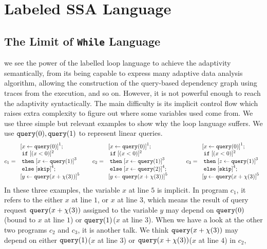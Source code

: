 \section{Labeled SSA Language}
%
{
\subsection{The Limit of {\tt While} Language}
we see the power of the labelled loop language to achieve the adaptivity semantically, from its being capable to express many adaptive data analysis algorithm,  allowing the construction of the query-based dependency graph using traces from the execution, and so on.
However, it is not powerful enough to reach the adaptivity syntactically. The main difficulty is its implicit control flow which raises extra complexity to figure out where some variables used come from. We use three simple but relevant examples to show why the loop language suffers. We use ${\tt query}(0),{\tt query}(1)$ to represent linear queries.
%
\[
 c_1 = \begin{array}{l}
      \clabel{ \assign{x}{\query(0)}}^{1} ; \\
      \eif  [(x < 0 )]^{2} \\
      \ethen \clabel{\assign{x}{\query(1)}}^{3}\\
      \eelse \clabel{\eskip}^{4} ; \\
      \clabel{\assign{y}{\query(x+\chi(3))}}^{5}
 \end{array}
 ~~~~~
 c_2 = \begin{array}{l}
      \clabel{ \assign{x}{\query(0)}}^{1} ; \\
      \eif  [(x < 0 )]^{2} \\
      \ethen \clabel{\assign{x}{\query(1)}}^{3}\\
      \eelse \clabel{\assign{x}{\query(2)}}^{4} ; \\
      \clabel{\assign{y}{\query(x+\chi(3))}}^{5}
 \end{array}
 ~~~~~~~~
  c_3 = \begin{array}{l}
      \clabel{ \assign{x}{\query(0)}}^{1} ; \\
      \eif  [(x < 0 )]^{2} \\
      \ethen \clabel{\assign{z}{\query(1)}}^{3}\\
      \eelse \clabel{\eskip}^{4} ; \\
      \clabel{\assign{y}{\query(x+\chi(3)}}^{5}
 \end{array}
\]
In these three examples, the variable $x$ at line $5$ is implicit. In program $c_1$, it refers to the either $x$ at line $1$, or $x$ at line $3$, which means the result of query request ${\tt query}(x+\chi(3))$ assigned to the variable $y$ may depend on ${\tt query}(0)$(bound to $x$ at line $1$) or ${\tt query}(1)$($x$ at line $3$). When we have a look at the other two programs $c_2$ and $c_3$, it is another talk. We think ${\tt query}(x+\chi(3))$ may depend on either ${\tt query}(1)$($x$ at line $3$) or ${\tt query}(x+\chi(3))$($x$ at line $4$) in $c_2$,     
}
